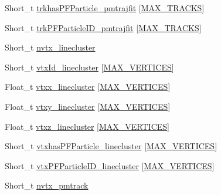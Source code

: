 \begin{DoxyCompactItemize}
\item 
Short\-\_\-t \hyperlink{classanatree_a0001ea589d625af0a469d81ac4ab354d}{trkhas\-P\-F\-Particle\-\_\-pmtrajfit} \mbox{[}\hyperlink{anatree__core__v09410002__orig_8h_a327fd4e796e4a0d78947524c96e4362e}{M\-A\-X\-\_\-\-T\-R\-A\-C\-K\-S}\mbox{]}
\item 
Short\-\_\-t \hyperlink{classanatree_a3b82c4cb8ab4a905b058baadd1533346}{trk\-P\-F\-Particle\-I\-D\-\_\-pmtrajfit} \mbox{[}\hyperlink{anatree__core__v09410002__orig_8h_a327fd4e796e4a0d78947524c96e4362e}{M\-A\-X\-\_\-\-T\-R\-A\-C\-K\-S}\mbox{]}
\item 
Short\-\_\-t \hyperlink{classanatree_ae8a9245846fa5bf357860f3ab6a17c5c}{nvtx\-\_\-linecluster}
\item 
Short\-\_\-t \hyperlink{classanatree_a767a1b4ace99de6ac95968bbe5fb3f8d}{vtx\-Id\-\_\-linecluster} \mbox{[}\hyperlink{anatree__core__v09410002__orig_8h_a6ac49acb0970e608315ca232a9fc8828}{M\-A\-X\-\_\-\-V\-E\-R\-T\-I\-C\-E\-S}\mbox{]}
\item 
Float\-\_\-t \hyperlink{classanatree_ae231dc3326af03fc901759bcb6c39f5c}{vtxx\-\_\-linecluster} \mbox{[}\hyperlink{anatree__core__v09410002__orig_8h_a6ac49acb0970e608315ca232a9fc8828}{M\-A\-X\-\_\-\-V\-E\-R\-T\-I\-C\-E\-S}\mbox{]}
\item 
Float\-\_\-t \hyperlink{classanatree_aa533a7342c56e573951125ec11daeb13}{vtxy\-\_\-linecluster} \mbox{[}\hyperlink{anatree__core__v09410002__orig_8h_a6ac49acb0970e608315ca232a9fc8828}{M\-A\-X\-\_\-\-V\-E\-R\-T\-I\-C\-E\-S}\mbox{]}
\item 
Float\-\_\-t \hyperlink{classanatree_ac30b6e15a59a3f9196f6dd657e56c373}{vtxz\-\_\-linecluster} \mbox{[}\hyperlink{anatree__core__v09410002__orig_8h_a6ac49acb0970e608315ca232a9fc8828}{M\-A\-X\-\_\-\-V\-E\-R\-T\-I\-C\-E\-S}\mbox{]}
\item 
Short\-\_\-t \hyperlink{classanatree_a8b34d2e986cff37efa6366b6fac906aa}{vtxhas\-P\-F\-Particle\-\_\-linecluster} \mbox{[}\hyperlink{anatree__core__v09410002__orig_8h_a6ac49acb0970e608315ca232a9fc8828}{M\-A\-X\-\_\-\-V\-E\-R\-T\-I\-C\-E\-S}\mbox{]}
\item 
Short\-\_\-t \hyperlink{classanatree_a657fe1e33d56c77e99419c64c36df3e9}{vtx\-P\-F\-Particle\-I\-D\-\_\-linecluster} \mbox{[}\hyperlink{anatree__core__v09410002__orig_8h_a6ac49acb0970e608315ca232a9fc8828}{M\-A\-X\-\_\-\-V\-E\-R\-T\-I\-C\-E\-S}\mbox{]}
\item 
Short\-\_\-t \hyperlink{classanatree_aea614ee837b25918997ef74cd606f47e}{nvtx\-\_\-pmtrack}
\item 

\end{DoxyCompactItemize}
